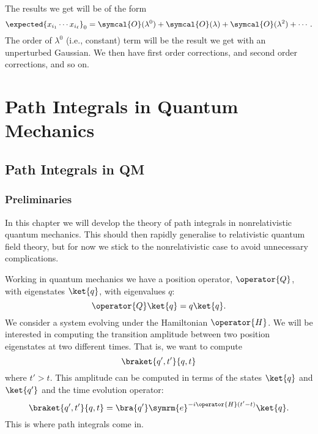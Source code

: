 \documentclass[fleqn]{NotesClass}
\newcommand{\e}{\symrm{e}}
\newcommand{\order}{\symcal{O}}
\begin{document}
    The results we get will be of the form
    \begin{equation}
        \expected{x_{i_1} \dotsm x_{i_\ell}}_0 = \order(\lambda^0) + \order(\lambda) + \order(\lambda^2) + \dotsb.
    \end{equation}
    The order of \(\lambda^0\) (i.e., constant) term will be the result we get with an unperturbed Gaussian.
    We then have first order corrections, and second order corrections, and so on.
    
    \part{Path Integrals in Quantum Mechanics}
    \chapter{Path Integrals in QM}
    \section{Preliminaries}
    In this chapter we will develop the theory of path integrals in nonrelativistic quantum mechanics.
    This should then rapidly generalise to relativistic quantum field theory, but for now we stick to the nonrelativistic case to avoid unnecessary complications.
    
    Working in quantum mechanics we have a position operator, \(\operator{Q}\), with eigenstates \(\ket{q}\), with eigenvalues \(q\):
    \begin{equation}
        \operator{Q}\ket{q} = q\ket{q}.
    \end{equation}
    We consider a system evolving under the Hamiltonian \(\operator{H}\).
    We will be interested in computing the transition amplitude between two position eigenstates at two different times.
    That is, we want to compute
    \begin{equation}
        \braket{q', t'}{q, t}
    \end{equation}
    where \(t' > t\).
    This amplitude can be computed in terms of the states \(\ket{q}\) and \(\ket{q'}\) and the time evolution operator:
    \begin{equation}
        \braket{q', t'}{q, t} = \bra{q'} \e^{-i\operator{H}(t' - t)}\ket{q}.
    \end{equation}
    This is where path integrals come in.
    
\end{document}
